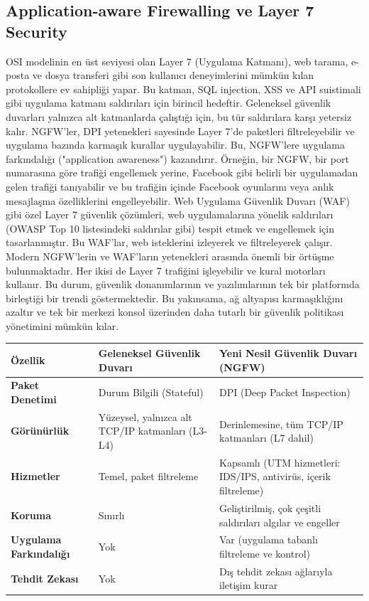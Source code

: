 \subsection{Application-aware Firewalling ve Layer 7 Security}

OSI modelinin en üst seviyesi olan Layer 7 (Uygulama Katmanı), web tarama, e-posta ve dosya transferi gibi son kullanıcı deneyimlerini mümkün kılan protokollere ev sahipliği yapar. Bu katman, SQL injection, XSS ve API suistimali gibi uygulama katmanı saldırıları için birincil hedeftir. Geleneksel güvenlik duvarları yalnızca alt katmanlarda çalıştığı için, bu tür saldırılara karşı yetersiz kalır.
NGFW'ler, DPI yetenekleri sayesinde Layer 7'de paketleri filtreleyebilir ve uygulama bazında karmaşık kurallar uygulayabilir. Bu, NGFW'lere uygulama farkındalığı ("application awareness") kazandırır. Örneğin, bir NGFW, bir port numarasına göre trafiği engellemek yerine, Facebook gibi belirli bir uygulamadan gelen trafiği tanıyabilir ve bu trafiğin içinde Facebook oyunlarını veya anlık mesajlaşma özelliklerini engelleyebilir.
Web Uygulama Güvenlik Duvarı (WAF) gibi özel Layer 7 güvenlik çözümleri, web uygulamalarına yönelik saldırıları (OWASP Top 10 listesindeki saldırılar gibi) tespit etmek ve engellemek için tasarlanmıştır. Bu WAF'lar, web isteklerini izleyerek ve filtreleyerek çalışır. Modern NGFW'lerin ve WAF'ların yetenekleri arasında önemli bir örtüşme bulunmaktadır. Her ikisi de Layer 7 trafiğini işleyebilir ve kural motorları kullanır. Bu durum, güvenlik donanımlarının ve yazılımlarının tek bir platformda birleştiği bir trendi göstermektedir. Bu yakınsama, ağ altyapısı karmaşıklığını azaltır ve tek bir merkezi konsol üzerinden daha tutarlı bir güvenlik politikası yönetimini mümkün kılar.

\begin{adjustbox}{max width=\textwidth}
\begin{tabularx}{\textwidth}{|l|X|X|}
\hline
\textbf{Özellik} & \textbf{Geleneksel Güvenlik Duvarı} & \textbf{Yeni Nesil Güvenlik Duvarı (NGFW)} \\
\hline
\textbf{Paket Denetimi} & Durum Bilgili (Stateful) & DPI (Deep Packet Inspection) \\
\hline
\textbf{Görünürlük} & Yüzeysel, yalnızca alt TCP/IP katmanları (L3-L4) & Derinlemesine, tüm TCP/IP katmanları (L7 dahil) \\
\hline
\textbf{Hizmetler} & Temel, paket filtreleme & Kapsamlı (UTM hizmetleri: IDS/IPS, antivirüs, içerik filtreleme) \\
\hline
\textbf{Koruma} & Sınırlı & Geliştirilmiş, çok çeşitli saldırıları algılar ve engeller \\
\hline
\textbf{Uygulama Farkındalığı} & Yok & Var (uygulama tabanlı filtreleme ve kontrol) \\
\hline
\textbf{Tehdit Zekası} & Yok & Dış tehdit zekası ağlarıyla iletişim kurar \\
\hline
\end{tabularx}
\end{adjustbox}


